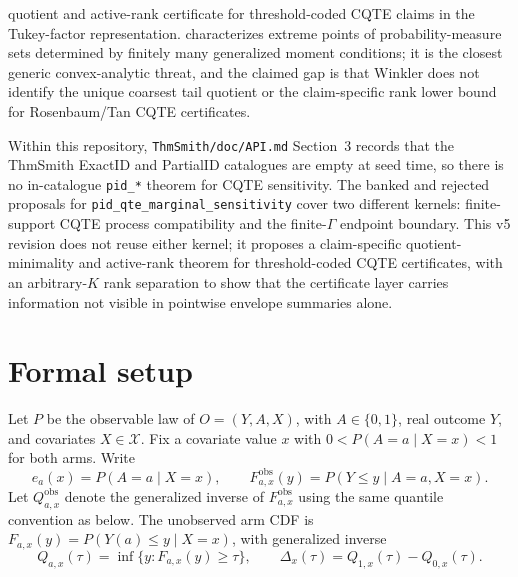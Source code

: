 \documentclass[11pt]{article}
\theoremstyle{definition}
\theoremstyle{plain}
\theoremstyle{remark}
\begin{document}
quotient and active-rank certificate for threshold-coded CQTE claims in the Tukey-factor representation.  \citet{Winkler1988} characterizes extreme points of probability-measure sets determined by finitely many generalized moment conditions; it is the closest generic convex-analytic threat, and the claimed gap is that Winkler does not identify the unique coarsest tail quotient or the claim-specific rank lower bound for Rosenbaum/Tan CQTE certificates.

Within this repository, \texttt{ThmSmith/doc/API.md} Section~3 records that the ThmSmith ExactID and PartialID catalogues are empty at seed time, so there is no in-catalogue \texttt{pid\_*} theorem for CQTE sensitivity.  The banked and rejected proposals for \texttt{pid\_qte\_marginal\_sensitivity} cover two different kernels: finite-support CQTE process compatibility and the finite-\(\Gamma\) endpoint boundary.  This v5 revision does not reuse either kernel; it proposes a claim-specific quotient-minimality and active-rank theorem for threshold-coded CQTE certificates, with an arbitrary-\(K\) rank separation to show that the certificate layer carries information not visible in pointwise envelope summaries alone.

\section{Formal setup}
Let \(P\) be the observable law of \(O=(Y,A,X)\), with \(A\in\{0,1\}\), real outcome \(Y\), and covariates \(X\in\mathcal{X}\).  Fix a covariate value \(x\) with \(0<P(A=a\mid X=x)<1\) for both arms.  Write
\[
e_a(x)=P(A=a\mid X=x),\qquad
F^{\mathrm{obs}}_{a,x}(y)=P(Y\le y\mid A=a,X=x).
\]
Let \(Q^{\mathrm{obs}}_{a,x}\) denote the generalized inverse of \(F^{\mathrm{obs}}_{a,x}\) using the same quantile convention as below.
The unobserved arm CDF is \(F_{a,x}(y)=P(Y(a)\le y\mid X=x)\), with generalized inverse
\[
Q_{a,x}(\tau)=\inf\{y:F_{a,x}(y)\ge \tau\},\qquad
\Delta_x(\tau)=Q_{1,x}(\tau)-Q_{0,x}(\tau).
\]
\end{document}
